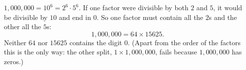 $1{,}000{,}000=10^6=2^6\cdot5^6$. If one factor were divisible by both $2$ and $5$, it would be divisible by $10$ and end in $0$. So one factor must contain all the $2$s and the other all the $5$s:
\[
1{,}000{,}000=\boxed{64\times15625}.
\]
Neither $64$ nor $15625$ contains the digit $0$. (Apart from the order of the factors this is the only way: the other split, $1\times1{,}000{,}000$, fails because $1{,}000{,}000$ has zeros.)

